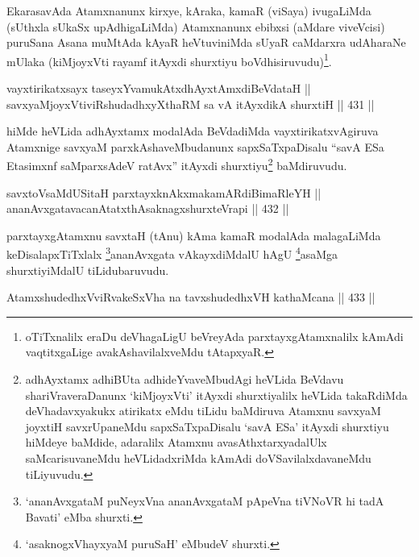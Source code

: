 \begin{artha}
EkarasavAda Atamxnanunx kirxye, kAraka, kamaR (viSaya) ivugaLiMda
(sUthxla sUkaSx upAdhigaLiMda) Atamxnanunx ebibxsi (aMdare viveVcisi)
puruSana Asana muMtAda kAyaR heVtuviniMda sUyaR caMdarxra udAharaNe
mUlaka (kiMjoyxVti rayamf itAyxdi shurxtiyu
boVdhisiruvudu)\footnote{oTiTxnalilx eraDu deVhagaLigU beVreyAda
parxtayxgAtamxnalilx kAmAdi vaqtitxgaLige avakAshavilalxveMdu
tAtapxyaR.}.
\end{artha}

\begin{shl}
vayxtirikatxsayx taseyxYvamukAtxdhAyxtAmxdiBeVdataH || \\
savxyaMjoyxVtiviRshudadhxyXthaRM sa vA itAyxdikA shurxtiH \hfill || 431 ||  
\end{shl}

\begin{artha}
hiMde heVLida adhAyxtamx modalAda BeVdadiMda vayxtirikatxvAgiruva
Atamxnige savxyaM parxkAshaveMbudanunx sapxSaTxpaDisalu ``savA ESa Etasimxnf saMparxsAdeV ratAvx''
itAyxdi shurxtiyu\footnote{adhAyxtamx adhiBUta adhideYvaveMbudAgi
heVLida BeVdavu shariVraveraDanunx `kiMjoyxVti' itAyxdi
shurxtiyalilx heVLida takaRdiMda deVhadavxyakukx atirikatx eMdu
tiLidu baMdiruva Atamxnu savxyaM joyxtiH savxrUpaneMdu
sapxSaTxpaDisalu `savA ESa' itAyxdi shurxtiyu hiMdeye baMdide,
adaralilx Atamxnu avasAthxtarxyadalUlx saMcarisuvaneMdu
heVLidadxriMda kAmAdi doVSavilalxdavaneMdu tiLiyuvudu.} baMdiruvudu.
\end{artha}

\begin{shl}
savxtoV\s saMdUSitaH parxtayxknAkxmakamARdiBimaRleYH || \\
ananAvxgatavacanAtatxthA\s saknagxshurxteVrapi \hfill || 432 ||  
\end{shl}

\begin{artha}
parxtayxgAtamxnu savxtaH (tAnu) kAma kamaR modalAda malagaLiMda
keDisalapxTiTxlalx \footnote{`ananAvxgataM puNeyxVna ananAvxgataM pApeVna tiVNoVR hi tadA Bavati' eMba shurxti.}ananAvxgata vAkayxdiMdalU
hAgU \footnote{`asaknogxVhayxyaM puruSaH' eMbudeV shurxti.}asaMga shurxtiyiMdalU tiLidubaruvudu.
\end{artha}


\begin{shl}
AtamxshudedhxVviRvakeSxVha na tavxshudedhxVH kathaMcana \hfill || 433 ||
\end{shl}

